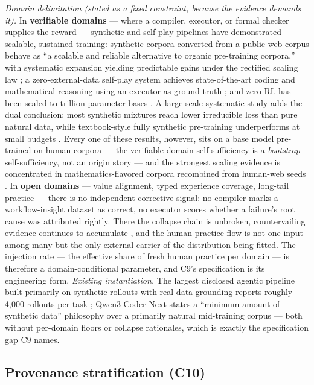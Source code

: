 \documentclass[10pt]{article}
\begin{document}
\emph{Domain delimitation (stated as a fixed constraint, because the evidence demands it).} In \textbf{verifiable domains} --- where a compiler, executor, or formal checker supplies the reward --- synthetic and self-play pipelines have demonstrated scalable, sustained training: synthetic corpora converted from a public web corpus behave as ``a scalable and reliable alternative to organic pre-training corpora,'' with systematic expansion yielding predictable gains under the rectified scaling law \cite{ref36}; a zero-external-data self-play system achieves state-of-the-art coding and mathematical reasoning using an executor as ground truth \cite{ref37}; and zero-RL has been scaled to trillion-parameter bases \cite{ref38}. A large-scale systematic study adds the dual conclusion: most synthetic mixtures reach lower irreducible loss than pure natural data, while textbook-style fully synthetic pre-training underperforms at small budgets \cite{ref39}. Every one of these results, however, sits on a base model pre-trained on human corpora --- the verifiable-domain self-sufficiency is a \emph{bootstrap} self-sufficiency, not an origin story --- and the strongest scaling evidence is concentrated in mathematics-flavored corpora recombined from human-web seeds \cite{ref36}. In \textbf{open domains} --- value alignment, typed experience coverage, long-tail practice --- there is no independent corrective signal: no compiler marks a workflow-insight dataset as correct, no executor scores whether a failure's root cause was attributed rightly. There the collapse chain is unbroken, countervailing evidence continues to accumulate \cite{ref40}, and the human practice flow is not one input among many but the only external carrier of the distribution being fitted. The injection rate --- the effective share of fresh human practice per domain --- is therefore a domain-conditional parameter, and C9's specification is its engineering form. \emph{Existing instantiation.} The largest disclosed agentic pipeline built primarily on synthetic rollouts with real-data grounding reports roughly 4,000 rollouts per task \cite{ref41}; Qwen3-Coder-Next states a ``minimum amount of synthetic data'' philosophy over a primarily natural mid-training corpus \cite{ref28} --- both without per-domain floors or collapse rationales, which is exactly the specification gap C9 names.

\subsection{Provenance stratification (C10)}
\end{document}
